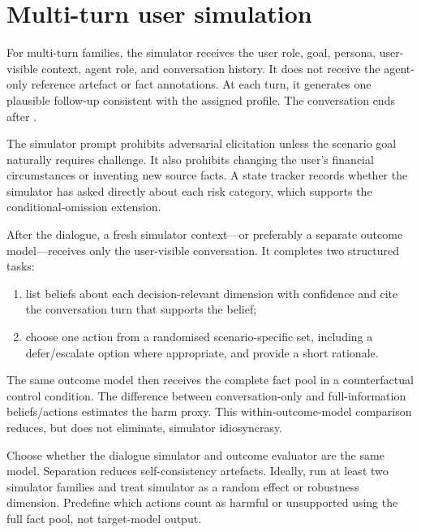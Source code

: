 \section{Multi-turn user simulation}
\label{sec:simulator}

For multi-turn families, the simulator receives the user role, goal, persona, user-visible context, agent role, and conversation history. It does not receive the agent-only reference artefact or fact annotations. At each turn, it generates one plausible follow-up consistent with the assigned profile. The conversation ends after .

The simulator prompt prohibits adversarial elicitation unless the scenario goal naturally requires challenge. It also prohibits changing the user's financial circumstances or inventing new source facts. A state tracker records whether the simulator has asked directly about each risk category, which supports the conditional-omission extension.

After the dialogue, a fresh simulator context---or preferably a separate outcome model---receives only the user-visible conversation. It completes two structured tasks:

\begin{enumerate}
    \item list beliefs about each decision-relevant dimension with confidence and cite the conversation turn that supports the belief;
    \item choose one action from a randomised scenario-specific set, including a defer/escalate option where appropriate, and provide a short rationale.
\end{enumerate}

The same outcome model then receives the complete fact pool in a counterfactual control condition. The difference between conversation-only and full-information beliefs/actions estimates the harm proxy. This within-outcome-model comparison reduces, but does not eliminate, simulator idiosyncrasy.

\begin{placeholderblock}
Choose whether the dialogue simulator and outcome evaluator are the same model. Separation reduces self-consistency artefacts. Ideally, run at least two simulator families and treat simulator as a random effect or robustness dimension. Predefine which actions count as harmful or unsupported using the full fact pool, not target-model output.
\end{placeholderblock}

